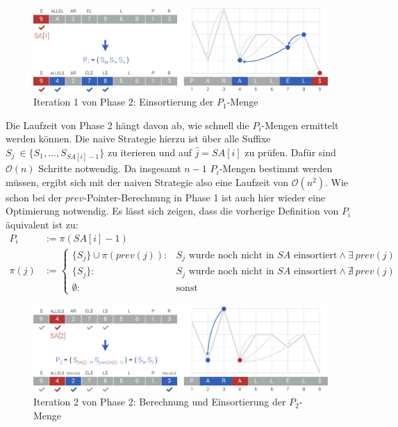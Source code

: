 \documentclass[twoside,a4paper,11pt]{article}
\theoremstyle{break}
\begin{document}
\begin{figure}[h]
	\centering
	\includegraphics[width=\linewidth,bb=0 0 1310 386]{./assets/phase2-1.pdf}
	\caption{Iteration 1 von Phase 2: Einsortierung der $P_1$-Menge}
\label{fig:phase2-1}
\end{figure}

Die Laufzeit von Phase 2 hängt davon ab, wie schnell die $P_i$-Mengen ermittelt werden können. Die naive Strategie hierzu ist über alle Suffixe $S_j \ \in \{ S_1, \dots, S_{SA[i] - 1} \}$ zu iterieren und auf $\widehat{j} = SA[i]$ zu prüfen. Dafür sind $\mathcal{O}(n)$ Schritte notwendig. Da insgesamt $n - 1$ $P_i$-Mengen bestimmt werden müssen, ergibt sich mit der naiven Strategie also eine Laufzeit von $\mathcal{O}(n^2)$. Wie schon bei der $prev$-Pointer-Berechnung in Phase 1 ist auch hier wieder eine Optimierung notwendig. Es lässt sich zeigen, dass die vorherige Definition von $P_i$ äquivalent ist zu:
\begin{align*}
	P_i &:= \pi(SA[i] - 1) \\
	\pi(j) &:= \begin{cases}
		\{ S_j \} \cup \pi(prev(j)): & S_j \text{ wurde noch nicht in $SA$ einsortiert} \land \exists\ prev(j) \\
		\{ S_j \}: & S_j \text{ wurde noch nicht in $SA$ einsortiert} \land \nexists\ prev(j) \\
		\emptyset: & \text{sonst}
	\end{cases}
\end{align*}
\begin{figure}[H]
	\centering
	\includegraphics[width=\linewidth,bb=0 0 1310 386]{./assets/phase2-2.pdf}
	\caption{Iteration 2 von Phase 2: Berechnung und Einsortierung der $P_2$-Menge}
\label{fig:phase2-2}
\end{figure}
\end{document}
